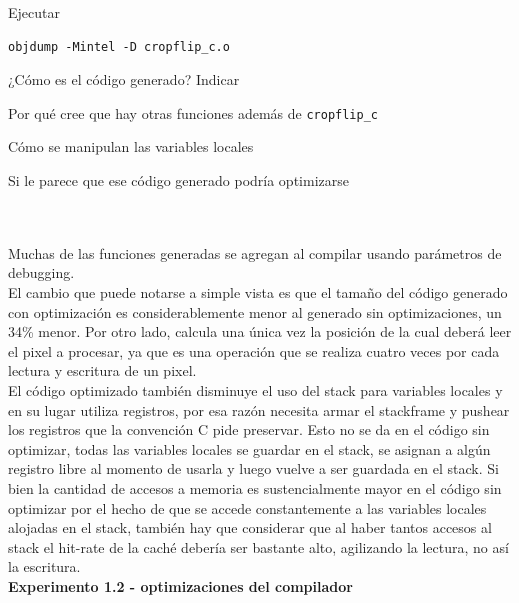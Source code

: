 Ejecutar 
\begin{codesnippet}
\begin{verbatim}
objdump -Mintel -D cropflip_c.o
\end{verbatim}
\end{codesnippet}

¿Cómo es el código generado? 
Indicar\\
\begin{inparaenum}
    \item Por qué cree que hay otras funciones además de \verb|cropflip_c|
    \item Cómo se manipulan las variables locales
    \item Si le parece que ese código generado podría optimizarse
\end{inparaenum}\\
\\
\indent Muchas de las funciones generadas se agregan al compilar usando parámetros de debugging.\\ 
\indent El cambio que puede notarse a simple vista es que el tamaño del código generado con optimización es considerablemente menor al generado sin optimizaciones, un 34\% menor. Por otro lado, calcula una única vez la posición de la cual deberá leer el pixel a procesar, ya que es una operación que se realiza cuatro veces por cada lectura y escritura de un pixel. \\
\indent El c\'odigo optimizado también disminuye el uso del stack para variables locales y en su lugar utiliza registros, por esa razón necesita armar el stackframe y pushear los registros que la convención C pide preservar. Esto no se da en el c\'odigo sin optimizar, todas las variables locales se guardar en el stack, se asignan a algún registro libre al momento de usarla y luego vuelve a ser guardada en el stack. Si bien la cantidad de accesos a memoria es sustencialmente mayor en el c\'odigo sin optimizar por el hecho de que se accede constantemente a las variables locales alojadas en el stack, también hay que considerar que al haber tantos accesos al stack el hit-rate de la caché debería ser bastante alto, agilizando la lectura, no así la escritura. \\

\vspace*{0.3cm} \noindent
\textbf{Experimento 1.2 - optimizaciones del compilador}

